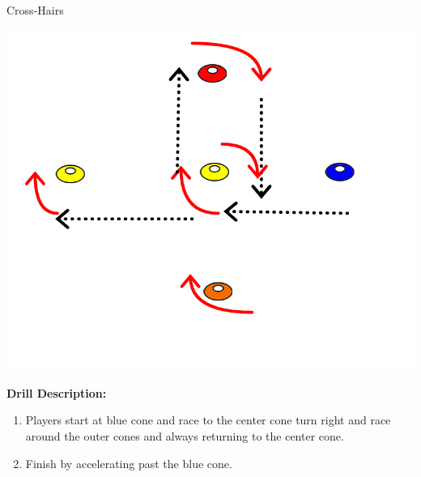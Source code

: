 
\begin{oddBlock}{Cross-Hairs}

\begin{minipage}[t]{\linewidth}
    \centering
    
    \begin{minipage}{.3\linewidth} %
        
        \centering
        \includegraphics[width=.6\textwidth]{../img/Trimmed/cross_hairs}

    \end{minipage}
    \hspace{0.05\linewidth}
    \begin{minipage}{.6\linewidth} %
        \textbf{Drill Description:}
        
        \begin{enumerate}
        \setlength{\itemsep}{0pt}
        \setlength{\parskip}{0pt}
        \setlength{\parsep}{0pt}
        \item Players start at blue cone and race to the center cone turn right and race around the outer cones and always returning to the center cone.
        \item Finish by accelerating past the blue cone.
        \end{enumerate}
    \end{minipage}
\end{minipage}
%

\end{oddBlock}